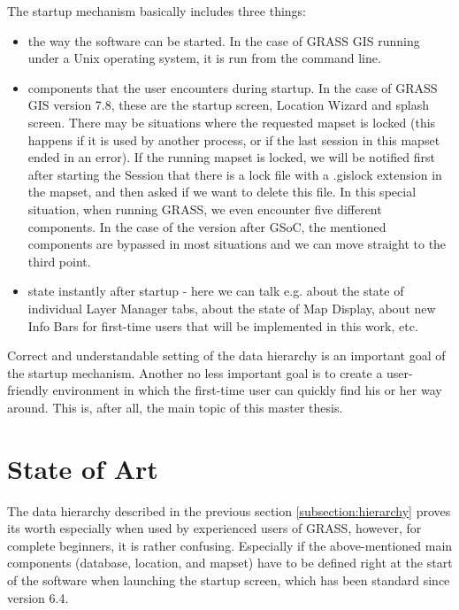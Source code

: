 \documentclass[a4paper,10pt,twoside]{article}
\begin{document}
\noindent The startup mechanism basically includes three things:

\begin {itemize}

\item the way the software can be started. In the case of GRASS GIS running under a Unix operating system, it is run from the command line.

\item components that the user encounters during startup. In the case of GRASS GIS version 7.8, these are the startup screen, Location Wizard and splash screen. There may be situations where the requested mapset is locked (this happens if it is used by another process, or if the last session in this mapset ended in an error). If the running mapset is locked, we will be notified first after starting the Session that there is a lock file with a .gislock extension in the mapset, and then asked if we want to delete this file. In this special situation, when running GRASS, we even encounter five different components.
In the case of the version after GSoC, the mentioned components are bypassed in most situations and we can move straight to the third point.

\item state instantly after startup - here we can talk e.g. about the state of individual Layer Manager tabs,  about the state of Map Display, about new Info Bars for first-time users that will be implemented in this work, etc. 

\end{itemize}

\noindent Correct and understandable setting of the data hierarchy is an important goal of the startup mechanism. Another no less important goal is to create a user-friendly environment in which the first-time user can quickly find his or her way around. This is, after all, the main topic of this master thesis.

\newpage
\vspace*{-1cm}
\section{State of Art}
\label{State of Art}
\noindent
\large
The data hierarchy described in the previous section \ref{subsection:hierarchy} proves its worth especially when used by experienced users of GRASS, however, for complete beginners, it is rather confusing. Especially if the above-mentioned main components (database, location, and mapset) have to be defined right at the start of the software when launching the startup screen, which has been standard since version 6.4. 
\end{document}
